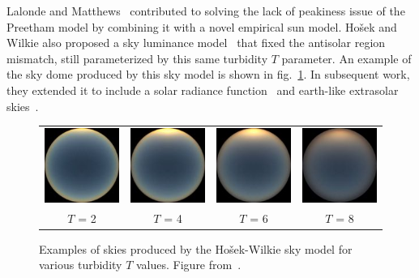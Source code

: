 Lalonde and Matthews~\cite{lalonde-3dv-14} contributed to solving the lack of peakiness issue of the Preetham model by combining it with a novel empirical sun model. Ho\v{s}ek and Wilkie also proposed a sky luminance model~\cite{hosek-siggraph-12} that fixed the antisolar region mismatch, still parameterized by this same turbidity $T$ parameter. An example of the sky dome produced by this sky model is shown in fig.~\ref{fig:hw_sky_model}. In subsequent work, they extended it to include a solar radiance function~\cite{hosek-cga-13} and earth-like extrasolar skies~\cite{wilkie2013predicting}.


\begin{figure}
\centering
\begin{tabular}{@{}c@{}c@{}c@{}c@{}}
\includegraphics[width=0.23\linewidth]{3rdparty/hw-004.jpg} &
\includegraphics[width=0.23\linewidth]{3rdparty/hw-005.jpg} &
\includegraphics[width=0.23\linewidth]{3rdparty/hw-006.jpg} &
\includegraphics[width=0.23\linewidth]{3rdparty/hw-007.jpg} \\
$T$ = 2 & $T$ = 4 & $T$ = 6 & $T$ = 8 \\
\end{tabular}
\caption[Examples of skies produced by the Ho\v{s}ek-Wilkie sky model]{Examples of skies produced by the Ho\v{s}ek-Wilkie sky model for various turbidity $T$ values. Figure from~\cite{hosek-siggraph-12}.}
\label{fig:hw_sky_model}
\end{figure}

